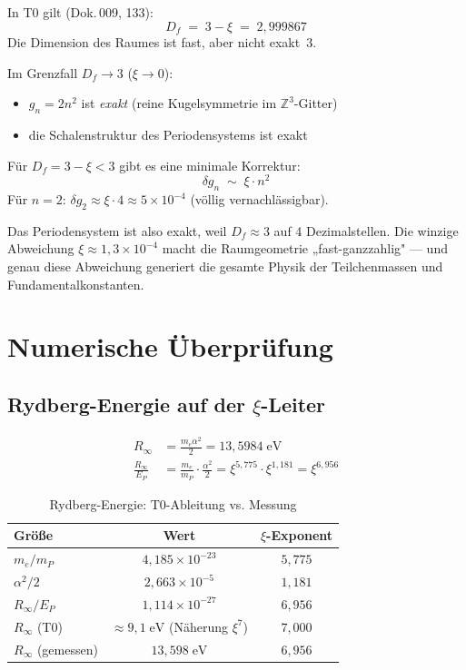 In T0 gilt (Dok.\,009, 133):
\begin{equation}
  D_f \;=\; 3 - \xi \;=\; 2{,}999867
\end{equation}
Die Dimension des Raumes ist fast, aber nicht exakt~3.

Im Grenzfall $D_f \to 3$ ($\xi \to 0$):
\begin{itemize}
  \item $g_n = 2n^2$ ist \emph{exakt} (reine Kugelsymmetrie im $\mathbb{Z}^3$-Gitter)
  \item die Schalenstruktur des Periodensystems ist exakt
\end{itemize}

Für $D_f = 3 - \xi < 3$ gibt es eine minimale Korrektur:
\begin{equation}
  \delta g_n \;\sim\; \xi \cdot n^2
\end{equation}
Für $n = 2$: $\delta g_2 \approx \xi \cdot 4 \approx 5 \times 10^{-4}$
(völlig vernachlässigbar).

Das Periodensystem ist also exakt, weil $D_f \approx 3$ auf 4 Dezimalstellen.
Die winzige Abweichung $\xi \approx 1{,}3 \times 10^{-4}$ macht die Raumgeometrie
„fast-ganzzahlig" — und genau diese Abweichung generiert die gesamte
Physik der Teilchenmassen und Fundamentalkonstanten.

\section{Numerische Überprüfung}
\label{sec:numerik}

\subsection{Rydberg-Energie auf der \texorpdfstring{$\xi$}{xi}-Leiter}

\begin{align}
  R_\infty &= \frac{m_e \alpha^2}{2} = 13{,}5984\;\text{eV} \\
  \frac{R_\infty}{E_P} &= \frac{m_e}{m_P} \cdot \frac{\alpha^2}{2}
    = \xi^{5{,}775} \cdot \xi^{1{,}181}
    = \xi^{6{,}956}
\end{align}

\begin{table}[htbp]
\centering
\caption{Rydberg-Energie: T0-Ableitung vs. Messung}
\label{tab:rydberg}
\begin{tabular}{lcc}
\hline
Größe & Wert & $\xi$-Exponent \\
\hline
$m_e / m_P$       & $4{,}185 \times 10^{-23}$ & $5{,}775$ \\
$\alpha^2 / 2$    & $2{,}663 \times 10^{-5}$  & $1{,}181$ \\
$R_\infty / E_P$  & $1{,}114 \times 10^{-27}$ & $6{,}956$ \\
$R_\infty$ (T0)   & $\approx 9{,}1\;\text{eV}$ (Näherung $\xi^7$) & $7{,}000$ \\
$R_\infty$ (gemessen) & $13{,}598\;\text{eV}$ & $6{,}956$ \\
\hline
\end{tabular}
\end{table}

